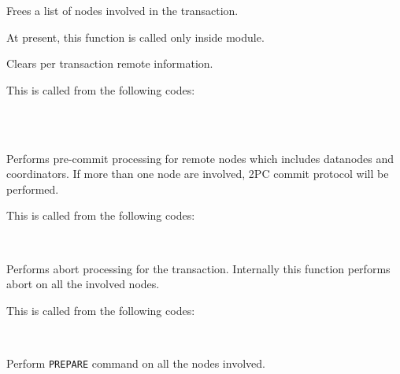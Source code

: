       Frees a list of nodes involved in the transaction.
      
      At present, this function is called only inside  module.
  
  
      Clears per transaction remote information.
      
      This is called from the following codes:
      
      \FuncRefHdr
		  \\ \vspace{3pt}
		  \\ \hline
      \FuncRefTrailor
  
  
      Performs pre-commit processing for remote nodes which includes datanodes and
      coordinators.
      If more than one node are involved, 2PC commit protocol will be performed.
      
      This is called from the following codes:
      
      \FuncRefHdr
		  \\ \hline
      \FuncRefTrailor
  
  
      Performs abort processing for the transaction.
      Internally this function performs abort on all the involved nodes.
      
      This is called from the following codes:
      
      \FuncRefHdr
		  \\ \hline
      \FuncRefTrailor
  
  
      Perform \texttt{PREPARE} command on all the nodes involved.
      
